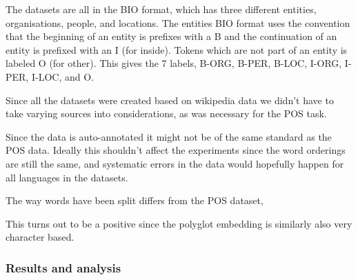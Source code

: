 The datasets are all in the BIO format, which has three different entities,
organisations, people, and locations. The entities BIO format uses the
convention that the beginning of an entity is prefixes with a B and the
continuation of an entity is prefixed with an I (for inside). Tokens which are
not part of an entity is labeled O (for other). This gives the 7 labels, B-ORG,
B-PER, B-LOC, I-ORG, I-PER, I-LOC, and O. 

Since all the datasets were created based on wikipedia data we didn't have to
take varying sources into considerations, as was necessary for the POS task.

Since the data is auto-annotated it might not be of the same standard as the POS
data. Ideally this shouldn't affect the experiments since the word orderings are
still the same, and systematic errors in the data would hopefully happen for all
languages in the datasets.

The way words have been split differs from the POS dataset, 

This turns out to be a positive since the polyglot embedding is similarly also
very character based.

\subsubsection{Results and analysis}


\pagebreak
